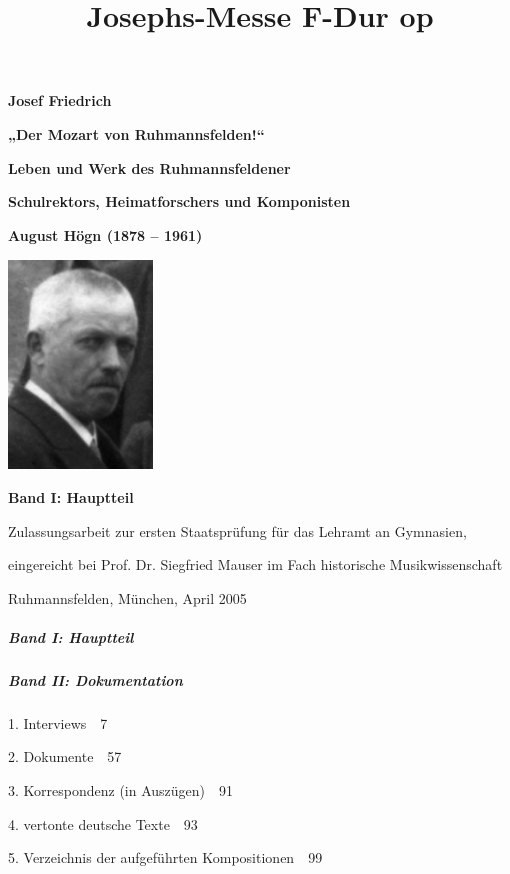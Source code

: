 \documentclass[a4paper]{article}
\title{Josephs-Messe F-Dur op}
\begin{document}
{\centering\bfseries
Josef Friedrich
\par}

{\centering
\textbf{„Der Mozart von Ruhmannsfelden!“}
\par}

{\centering\bfseries
\textmd{Leben und Werk des Ruhmannsfeldener }
\par}

{\centering\bfseries
\textmd{Schulrektors, Heimatforschers und Komponisten }
\par}

{\centering\bfseries
\textmd{August Högn (1878 – 1961)}
\par}

{\centering
\includegraphics[width=3.836cm,height=5.556cm]{pictures/August-Hoegn_Nachruf.jpg}
 \par}
{\centering\bfseries
Band I: Hauptteil
\par}

{\centering
Zulassungsarbeit zur ersten Staatsprüfung für das Lehramt an Gymnasien,
\par}

{\centering
eingereicht bei Prof. Dr. Siegfried Mauser im Fach historische
Musikwissenschaft
\par}

{\centering
Ruhmannsfelden, München, April 2005
\par}


\subparagraph[Band I: Hauptteil]{Band I: Hauptteil}
\setcounter{tocdepth}{4}
\renewcommand\contentsname{}
\tableofcontents
\clearpage\subparagraph{Band II: Dokumentation}
1. Interviews\ \ 7

2. Dokumente\ \ 57

3. Korrespondenz (in Auszügen)\ \ 91

4. vertonte deutsche Texte\ \ 93

5. Verzeichnis der aufgeführten Kompositionen\ \ 99
\end{document}
